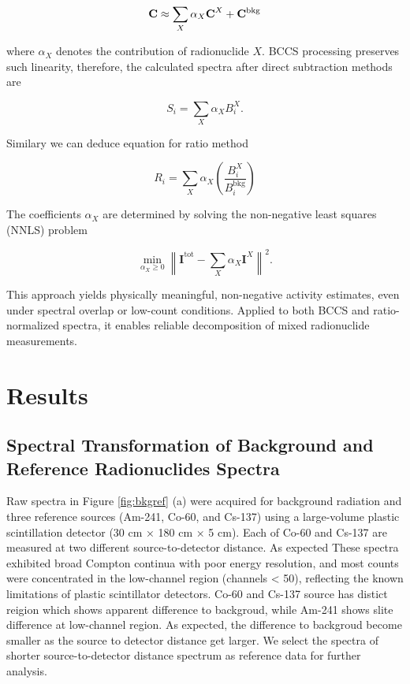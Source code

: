 \documentclass[10pt]{wlscirep}
\begin{document}
\begin{equation}
\textbf{C} \approx \sum_{X} \alpha_X \textbf{C}^{X} + \bf{C}^{\textrm{bkg}}
\end{equation}

\noindent where $\alpha_X$ denotes the contribution of radionuclide $X$. BCCS processing preserves such linearity, therefore, the calculated spectra after direct subtraction methods are

$$
S_i = \sum_X \alpha_XB_i^X.
$$

Similary we can deduce equation for ratio method

$$
R_i = \sum_X \alpha_X \left(\dfrac{B_i^X}{B_i^{\text{bkg}}}\right)
$$


The coefficients $\alpha_X$ are determined by solving the non-negative least squares (NNLS) problem

\begin{equation}
\min_{\alpha_X \ge 0} \left\| \textbf{I}^{\textrm{tot}} - \sum_{X} \alpha_X \textbf{I}^{X}\right\|^2 .
\end{equation}

This approach yields physically meaningful, non-negative activity estimates, even under spectral overlap or low-count conditions. Applied to both BCCS and ratio-normalized spectra, it enables reliable decomposition of mixed radionuclide measurements.

\section*{Results}


\subsection*{Spectral Transformation of Background and Reference Radionuclides Spectra}

Raw spectra in Figure \ref{fig:bkgref} (a) were acquired for background radiation and three reference sources (Am-241, Co-60, and Cs-137) using a large-volume plastic scintillation detector (30 cm × 180 cm × 5 cm). Each of Co-60 and Cs-137 are measured at two different source-to-detector distance. As expected These spectra exhibited broad Compton continua with poor energy resolution, and most counts were concentrated in the low-channel region (channels < 50), reflecting the known limitations of plastic scintillator detectors. Co-60 and Cs-137 source has distict reigion which shows apparent difference to backgroud, while Am-241 shows slite difference at low-channel region. As expected, the difference to backgroud become smaller as the source to detector distance get larger. We select the spectra of shorter source-to-detector distance spectrum as reference data for further analysis.
\end{document}
